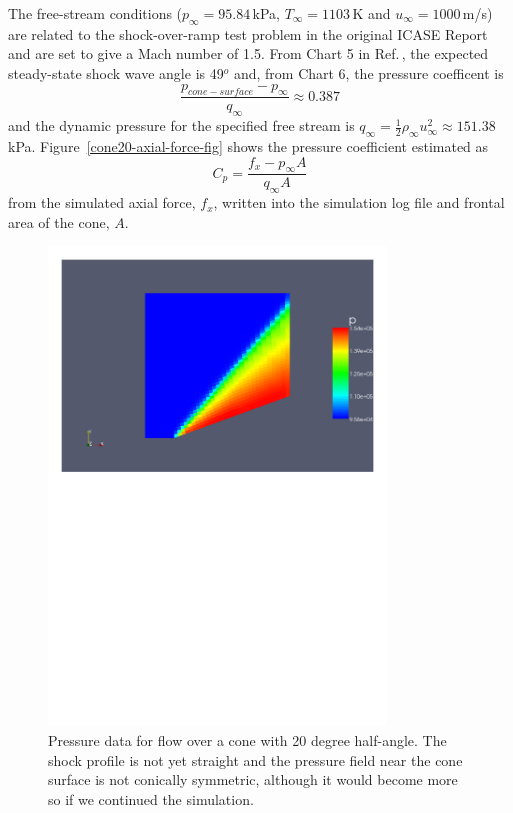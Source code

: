 \medskip
The free-stream conditions ($p_{\infty} = 95.84$\,kPa, $T_{\infty} = 1103$\,K
and $u_{\infty} = 1000$\,m/s) are related to the shock-over-ramp test problem
in the original ICASE Report\,\cite{jacobs_91d} and are set to give a 
Mach number of 1.5.
From Chart 5 in Ref.\,\cite{ames_53}, the expected steady-state shock wave
angle is 49$^o$ and, from Chart 6, the pressure coefficent is
$$
\frac{p_{cone-surface} - p_{\infty}}{q_{\infty}} \approx 0.387
$$
and the dynamic pressure for the specified free stream is
$q_{\infty} = \frac{1}{2} \rho_{\infty} u_{\infty}^2 \approx 151.38$\,kPa.
Figure~\ref{cone20-axial-force-fig} shows the pressure coefficient 
estimated as
$$
C_p = \frac{f_x - p_{\infty} A}{q_{\infty} A}
$$
from the simulated axial force, $f_x$, written into the simulation log file
and frontal area of the cone, $A$.

\begin{figure}[htbp]
\begin{center}
\includegraphics[width=0.8\textwidth, viewport=24 447 571 819]{../2D/cone20-simple/cone20_p.pdf}
\end{center}
\caption{Pressure data for flow over a cone with 20 degree half-angle.
         The shock profile is not yet straight and the pressure field
         near the cone surface is not conically symmetric, although it
	 would become more so if we continued the simulation.}
\label{cone20-pressure-fig}
\end{figure}

